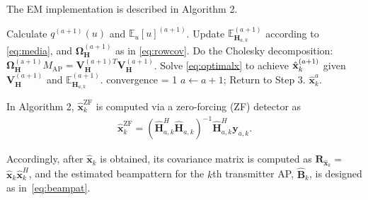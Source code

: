 \documentclass[conference,twocolumn,a4paper]{IEEEtran}
\theoremstyle{remark} \newtheorem{remark}{Remark}
\begin{document}
The EM implementation is described in Algorithm 2.
\begin{algorithm}\label{alg:coalitional}
\caption{EM Algorithm}
\begin{algorithmic}[1]
\footnotesize		 {}

        \State Calculate $q^{(a+1)}(u)$ and $\mathbb{E}_u[u]^{(a+1)}$.
		\State Update $\mathbb{E}_{\mathbf{H}_{a,k}}^{(a+1)}$ according to \eqref{eq:media}, and $\boldsymbol{\Omega}^{(a+1)}_{\mathbf{H}}$ as in \eqref{eq:rowcov}.
		\State Do the Cholesky decomposition:
			$\boldsymbol{\Omega}_{\mathbf{H}}^{\mathrm{(a+1)}}\!M_{\mathrm{AP}}$$=$$\mathbf{V}_{\mathbf{H}}^{(a +1)T} \mathbf{V}_{\mathbf{H}}^{(a+1)}$.
	\State Solve \eqref{eq:optimalx} to achieve $\Hat{\mathbf{x}}_k^{(a+1)}$ given $\mathbf{V}_{\mathbf{H}}^{(a+1)}$ and $\mathbb{E}_{\mathbf{H}_{a,k}}^{(a+1)}$.
		\State convergence = 1
		\Else
		\State $a \gets a+1$;
		\State Return to Step 3.
		\EndIf
		\EndWhile
		\State \Return $\hat{\mathbf{x}}_k^{a}$.
\end{algorithmic}
\end{algorithm}

In Algorithm 2, $\hat{\mathbf{x}}_k^{\mathrm{ZF}}$ is computed via a zero-forcing (ZF) detector as 
\begin{align}
    \hat{\mathbf{x}}_k^{\mathrm{ZF}} = (\hat{\mathbf{H}}_{a,k}^H\hat{\mathbf{H}}_{a,k})^{-1}\hat{\mathbf{H}}_{a,k}^H\mathbf{y}_{a,k}.
\end{align}

Accordingly, after $\hat{\mathbf{x}}_k$ is obtained, its covariance matrix is computed as $\mathbf{R}_{\hat{\mathbf{x}}_k}$$=$$\hat{\mathbf{x}}_k\hat{\mathbf{x}}_k^H$, and the estimated beampattern for the $k$th transmitter AP, $\hat{\mathbf{B}}_k$, is designed as in~\eqref{eq:beampat}.
\end{document}
